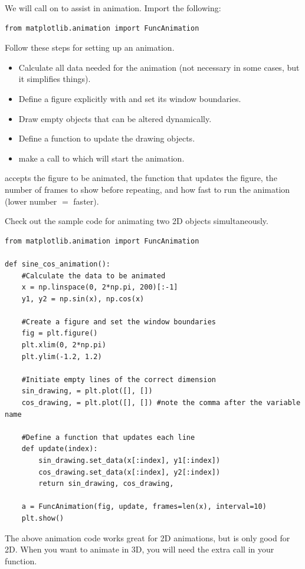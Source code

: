 We will call on  to assist in animation. Import the following:
\begin{lstlisting}
from matplotlib.animation import FuncAnimation
\end{lstlisting}
Follow these steps for setting up an animation.
\begin{itemize}
\item Calculate all data needed for the animation (not necessary in some cases, but it simplifies things).
\item Define a figure explicitly with  and set its window boundaries.
\item Draw empty objects that can be altered dynamically.
\item Define a function to update the drawing objects.
\item make a call to  which will start the animation.
\end{itemize}
 accepts the figure to be animated, the function that updates the figure, the number of frames to show before repeating, and how fast to run the animation (lower number $=$ faster).

Check out the sample code for animating two 2D objects simultaneously.
\begin{lstlisting}
from matplotlib.animation import FuncAnimation

def sine_cos_animation():
	#Calculate the data to be animated
	x = np.linspace(0, 2*np.pi, 200)[:-1]
	y1, y2 = np.sin(x), np.cos(x)
	
	#Create a figure and set the window boundaries
	fig = plt.figure()
	plt.xlim(0, 2*np.pi)
	plt.ylim(-1.2, 1.2)
	
	#Initiate empty lines of the correct dimension
	sin_drawing, = plt.plot([], [])
	cos_drawing, = plt.plot([], [])	#note the comma after the variable name
	
	#Define a function that updates each line
	def update(index):
		sin_drawing.set_data(x[:index], y1[:index])
		cos_drawing.set_data(x[:index], y2[:index])
		return sin_drawing, cos_drawing,
	
	a = FuncAnimation(fig, update, frames=len(x), interval=10)
	plt.show()
\end{lstlisting}

\begin{warn}
The above animation code works great for 2D animations, but  is only good for 2D. When you want to animate in 3D, you will need the extra  call in your  function.
\end{warn}

